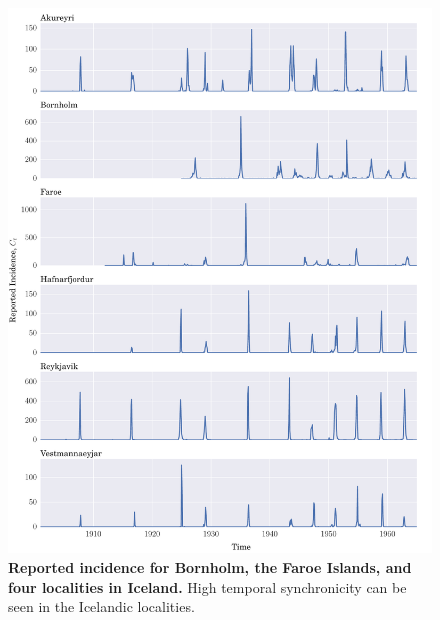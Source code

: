 \documentclass[10pt]{article}
\begin{document}
\begin{figure}[!h]
\centering
\includegraphics[width=\textwidth]{figures/0_incidence.pdf}
\caption{\textbf{Reported incidence for Bornholm, the Faroe Islands, and four localities in Iceland.} High temporal synchronicity can be seen in the Icelandic localities. }
\label{figIncidence}
\end{figure}
\end{document}
